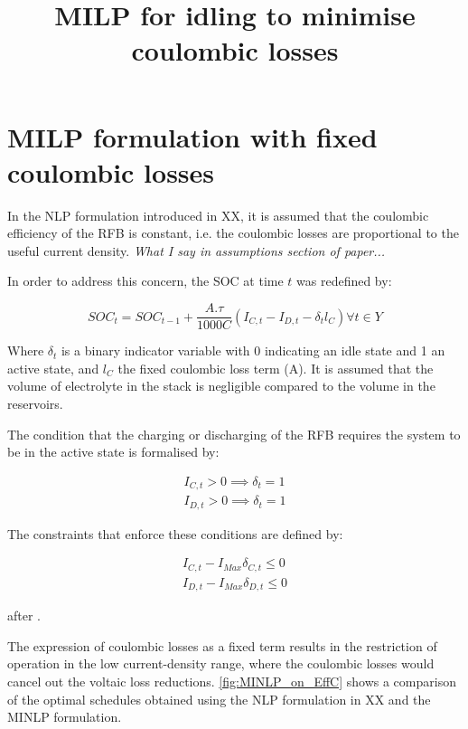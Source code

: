 \documentclass[preprint,3p,review,authoryear,10pt]{elsarticle}
\begin{document}
\linenumbers


\title{MILP for idling to minimise coulombic losses}

\section{MILP formulation with fixed coulombic losses}
In the NLP formulation introduced in XX, it is assumed that the coulombic efficiency of the RFB is constant, i.e. the coulombic losses are proportional to the useful current density. \textit{What I say in assumptions section of paper...}

In order to address this concern, the SOC at time $t$ was redefined by:

\begin{equation}
\label{eqn: Method_MINLP_SOC_Tracker}
SOC_t = SOC_{t-1} +\frac{A.\tau}{1000C}(I_{C, t} - I_{D, t} - \delta_tl_C) \forall t \in Y
\end{equation}

Where $\delta_t$ is a binary indicator variable with 0 indicating an idle state and 1 an active state, and $l_C$ the fixed coulombic loss term (\si{\ampere}). It is assumed that the volume of electrolyte in the stack is negligible compared to the volume in the reservoirs.

The condition that the charging or discharging of the RFB requires the system to be in the active state is formalised by:

\begin{equation}
\begin{split}
    \label{eqn: On_off_condition}
    I_{C,t} > 0 \implies \delta_t = 1\\
    I_{D,t} > 0 \implies \delta_t = 1
    \end{split}
\end{equation}

The constraints that enforce these conditions are defined by:

\begin{equation}
\begin{split}
    \label{eqn: on_off_constraint}
    I_{C,t} - I_{Max}\delta_{C,t} \leq 0\\ 
    I_{D,t} - I_{Max}\delta_{D,t} \leq 0
    \end{split}
\end{equation}

 after \cite{Williams2013}.
 
 The expression of coulombic losses as a fixed term results in the restriction of operation in the low current-density range, where the coulombic losses would cancel out the voltaic loss reductions. \cref{fig:MINLP_on_EffC} shows a comparison of the optimal schedules obtained using the NLP formulation in XX and the MINLP formulation.
 
\end{document}
